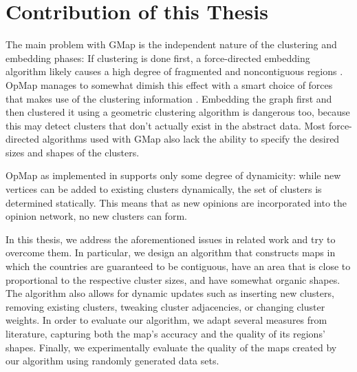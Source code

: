 \section{Contribution of this Thesis}
\label{sect:structure-of-this-thesis}

The main problem with GMap is the independent nature of the clustering and embedding phases:
If clustering is done first, a force-directed embedding algorithm likely causes a high degree of fragmented and noncontiguous regions \cite{mashima2011visualizing}.
OpMap manages to somewhat dimish this effect with a smart choice of forces that makes use of the clustering information \cite{schmettow2017}.
Embedding the graph first and then clustered it using a geometric clustering algorithm is dangerous too, because this may detect clusters that don't actually exist in the abstract data.
Most force-directed algorithms used with GMap also lack the ability to specify the desired sizes and shapes of the clusters.

OpMap as implemented in \cite{schmettow2017} supports only some degree of dynamicity: while new vertices can be added to existing clusters dynamically, the set of clusters is determined statically.
This means that as new opinions are incorporated into the opinion network, no new clusters can form.

In this thesis, we address the aforementioned issues in related work and try to overcome them.
In particular, we design an algorithm that constructs maps in which the countries are guaranteed to be contiguous, have an area that is close to proportional to the respective cluster sizes, and have somewhat organic shapes.
The algorithm also allows for dynamic updates such as inserting new clusters, removing existing clusters, tweaking cluster adjacencies, or changing cluster weights.
In order to evaluate our algorithm, we adapt several measures from literature, capturing both the map's accuracy and the quality of its regions' shapes.
Finally, we experimentally evaluate the quality of the maps created by our algorithm using randomly generated data sets.
